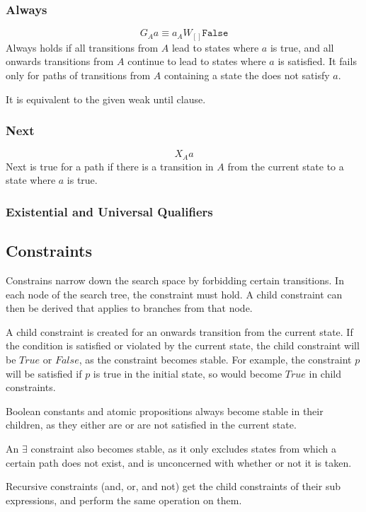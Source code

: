 \documentclass[a4paper,11pt]{article}
\begin{document}
	\subsubsection{Always}
	$$G{_Aa} \equiv a _A W{_{[]} \texttt{False}} $$
	Always holds if all transitions from $A$ lead to states where $a$ is true, and all onwards transitions from $A$ continue to lead to states where $a$ is satisfied. It fails only for paths of transitions from $A$ containing a state the does not satisfy $a$.
	
	It is equivalent to the given weak until clause.
	
	\subsubsection{Next}
	$$X{_Aa}$$
	Next is true for a path if there is a transition in $A$ from the current state to a state where $a$ is true. 
	
	\subsubsection{Existential and Universal Qualifiers}
	
	
	\subsection{Constraints}
	Constrains narrow down the search space by forbidding certain transitions. In each node of the search tree, the constraint must hold. A child constraint can then be derived that applies to branches from that node. 
	
	A child constraint is created for an onwards transition from the current state. If the condition is satisfied or violated by the current state, the child constraint will be $True$ or $False$, as the constraint becomes stable. For example, the constraint $p$ will be satisfied if $p$ is true in the initial state, so would become $True$ in child constraints.
	
	Boolean constants and atomic propositions always become stable in their children, as they either are or are not satisfied in the current state.	
	
	An $\exists$ constraint also becomes stable, as it only excludes states from which a certain path does not exist, and is unconcerned with whether or not it is taken.
	
	Recursive constraints (and, or, and not) get the child constraints of their sub expressions, and perform the same operation on them.
	
\end{document}
